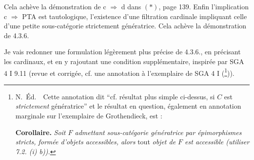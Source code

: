 \documentclass[11pt]{article}
\newcommand{\printedpage}[1]{\marginpar{\footnotesize p.~#1}}
\begin{document}
Cela achève la démonstration de c $\Longrightarrow$ d dans $(*)$, page 139. Enfin l'implication c $\Longrightarrow$ PTA est tautologique, l'existence d'une filtration cardinale impliquant celle d'une petite sous-catégorie strictement génératrice. Cela achève la démonstration de 4.3.6.

Je vais redonner une formulation légèrement plus précise de 4.3.6., en précisant les cardinaux, et en y rajoutant une condition supplémentaire, inspirée par SGA 4 I 9.11 (revue et corrigée, cf. une annotation à l'exemplaire de SGA 4 I (\footnote[58]{N.~Éd.\ \ Cette annotation dit “cf. résultat plus simple ci-dessus, si $C$ est \textit{strictement} génératrice” et
le résultat en question, également en annotation marginale sur l'exemplaire de Grothendieck, est :\par
\textbf{Corollaire.} \textit{Soit $F$ admettant} \textit{sous-catégorie génératrice par épimorphismes stricts, formée d'objets accessibles, alors} tout \textit{objet de $F$ est accessible (utiliser 7.2. (i) b)).}})).

\printedpage{48}
\end{document}
